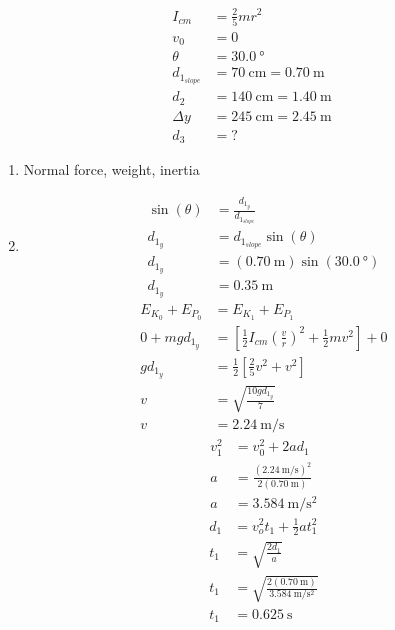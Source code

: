 \documentclass{article}
\begin{document}
\begin{align*}
	I_{cm} & = \frac{2}{5}mr^2 \\
	v_0 & = 0 \\
	\theta & = \SI{30.0}{\degree} \\
	d_{1_{slope}} & = \SI{70}{\centi \meter} = \SI{0.70}{\meter} \\
	d_2 & = \SI{140}{\centi \meter} = \SI{1.40}{\meter} \\
	\Delta y & = \SI{245}{\centi \meter} = \SI{2.45}{\meter} \\
	d_3 & = ?
\end{align*}
\begin{enumerate}[label = \boldalpha]
	\item
		Normal force, weight, inertia
	\item
		\begin{align*}
			\sin(\theta) & = \frac{ d_{1_y} }{ d_{1_{slope}} } \\
			d_{1_y} & = d_{1_{slope}}\sin(\theta) \\
			d_{1_y} & = (\SI{0.70}{\meter})\sin(\SI{30.0}{\degree}) \\
			d_{1_y} & = \SI{0.35}{\meter}
		\end{align*}
		\begin{align*}
			E_{K_0} + E_{P_0} & = E_{K_1} + E_{P_1} \\
			0 + mgd_{1_y} & = \left[ \frac{1}{2}I_{cm} \left( \frac{v}{r} \right)^2 + \frac{1}{2}mv^2 \right] + 0 \\
			gd_{1_y} & = \frac{1}{2} \left[ \frac{2}{5}v^2 + v^2 \right] \\
			v & = \sqrt{ \frac{ 10gd_{1_y} }{ 7 } } \\
			v & = \SI{2.24}{\meter \per \second}
		\end{align*}
		\begin{align*}
			v_1^2 & = v_0^2 + 2ad_1 \\
			a & = \frac{ (\SI{2.24}{\meter \per \second})^2 }{ 2(\SI{0.70}{\meter}) } \\
			a & = \SI{3.584}{\meter \per \second \squared}
		\end{align*}
		\begin{align*}
			d_1 & = v_o^2t_1 + \frac{1}{2}at_1^2 \\
			t_1 & = \sqrt{ \frac{ 2d_1 }{ a } } \\
			t_1 & = \sqrt{ \frac{ 2(\SI{0.70}{\meter}) }{ \SI{3.584}{\meter \per \second \squared} } } \\
			t_1 & = \SI{0.625}{\second}
		\end{align*}

\end{enumerate}
\end{document}
